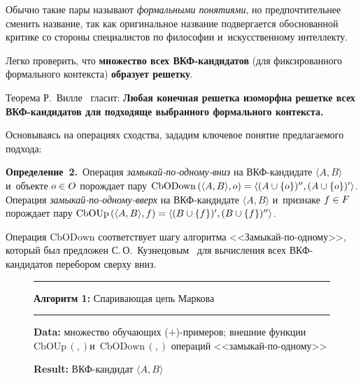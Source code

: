\begin{multicols}{2}
    Обычно такие пары называют \textit{формальными понятиями}, но 
предпочтительнее сменить название, так как оригинальное название 
подвергается обосно\-ван\-ной критике со стороны специалистов по философии и~искусственному интеллекту.
    
    Легко проверить, что \textbf{множество всех ВКФ-кан\-ди\-да\-тов} 
(для фиксированного формального контекста) \textbf{образует решетку}.
    
    Теорема Р.~Вилле~\cite{2-vin, 8-vin} гласит: \textbf{Любая конечная 
решетка изоморфна решетке всех ВКФ-кан\-ди\-да\-тов для подходяще 
выбранного формального контекста.}
    
    Основываясь на операциях сходства, зададим ключевое понятие 
предлагаемого подхода:
    
    \smallskip
    
    \noindent
     \textbf{Определение~2.}\ Операция \textit{за\-мы\-кай-по-од\-но\-му-вниз} на  
ВКФ-кан\-ди\-да\-те $\langle A, B\rangle$ и~объекте $o\hm\in O$ по\-рож\-да\-ет пару 
$\mathrm{CbODown}\,(\langle A, B\rangle, o)\hm= \langle (A\cup \{o\})^{\prime\prime}, 
(A\hm\cup 
\{o\})^\prime\rangle$. Операция \textit{за\-мы\-кай-по-од\-но\-му-вверх} на 
     ВКФ-кан\-ди\-да\-те $\langle A, B\rangle$ и~признаке $f\hm\in F$ порождает пару 
$\mathrm{CbOUp}\,(\langle A,B\rangle,f)\hm= \langle  (B\cup \{f\})^\prime, (B\cup 
\{f\})^{\prime\prime}\rangle$.
    
    Операция $\mathrm{CbODown}$ соответствует шагу алгоритма  
<<За\-мы\-кай-по-од\-но\-му>>, который был предложен 
С.\,О.~Кузнецовым~\cite{9-vin} для вычисления всех ВКФ-кан\-ди\-да\-тов 
перебором сверху вниз.
    
    
 \begin{figure*}[b]
    {\small
    \hrule
    \vspace*{4pt}
    
    \textbf{Алгоритм 1:} {\small Спаривающая цепь Маркова}
    
        \vspace*{4pt}
    
    \hrule
    
        \vspace*{4pt}
        
    \textbf{Data:} множество обучающих ($+$)-примеров; внешние функции 
$\mathrm{CbOUp}\,(,)$и~$\mathrm{CbODown}\,(,)$ операций <<за\-мы\-кай-по-од\-но\-му>>
    
    \textbf{Result:} ВКФ-кандидат $\langle A, B\rangle$
    
}
\end{figure*}
\end{multicols}
